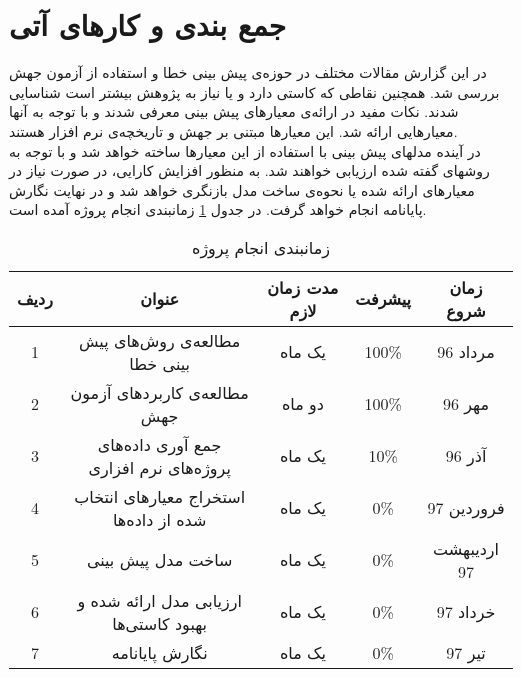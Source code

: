 \section{جمع بندی و کارهای آتی}
\label{sec:future}
 در این گزارش مقالات مختلف در حوزه‌ی پیش بینی خطا و استفاده از آزمون جهش بررسی شد. همچنین نقاطی که  کاستی دارد و یا نیاز به پژوهش بیشتر است شناسایی شدند. نکات مفید در ارائه‌ی معیارهای پیش بینی معرفی شدند و با توجه به آنها معیارهایی ارائه شد. این معیارها مبتنی بر جهش و تاریخچه‌ی نرم افزار هستند.\\
 
   در آینده مدلهای پیش بینی با استفاده از این معیارها ساخته خواهد شد و با توجه به روشهای گفته شده ارزیابی خواهند شد.  به منظور افزایش کارایی، در صورت نیاز در معیارهای ارائه شده یا نحوه‌ی ساخت مدل    بازنگری خواهد شد و در نهایت نگارش پایانامه انجام خواهد گرفت. در جدول \ref{tab:schedule} زمانبندی انجام پروژه آمده است.

\begin{table}[H] 
	\centering \caption{زمانبندی انجام پروژه}
	\label{tab:schedule}

	\begin{tabular}{|c|c|c|c|c|}
		\hline
		\hline
		 ردیف & عنوان & مدت زمان لازم & پیشرفت & زمان شروع
	 \\
		\hline
		\hline
1& مطالعه‌ی روش‌های پیش بینی خطا & یک ماه& 100\% & مرداد 96
		\\
		\hline
2 &مطالعه‌ی کاربردهای آزمون جهش  &دو ماه &100\%  &مهر 96 
		\\
		\hline
3 & جمع آوری داده‌های پروژه‌های نرم افزاری &  یک ماه& 10\% & آذر 96
		\\
		\hline
4 & استخراج معیارهای انتخاب شده از داده‌ها &  یک ماه& 0\% & فروردین 97
\\
\hline
5 & ساخت مدل پیش بینی &  یک ماه& 0\% & اردیبهشت 97
\\
\hline
6 & ارزیابی مدل ارائه شده و بهبود کاستی‌ها &  یک ماه& 0\% & خرداد 97
\\
\hline
7 & نگارش پایانامه &  یک ماه& 0\% & تیر 97\\


\hline
		
	 
	\end{tabular}
\end{table}
